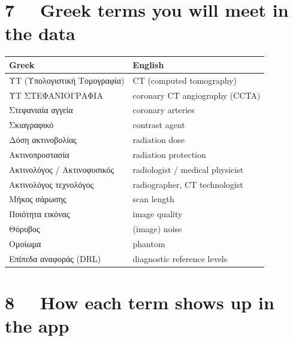 \documentclass[9pt,a4paper]{extarticle}
\newcommand{\hdr}{\rowcolor{ctsurf}}
\begin{document}
\begin{multicols}{2}
\section{7 \ \ Greek terms you will meet in the data}

\begin{tabularx}{\columnwidth}{@{}L L@{}}
\toprule
\hdr \textbf{Greek} & \textbf{English}\\
\midrule
ΥΤ (Υπολογιστική Τομογραφία) & CT (computed tomography)\\
ΥΤ ΣΤΕΦΑΝΙΟΓΡΑΦΙΑ & coronary CT angiography (CCTA)\\
Στεφανιαία αγγεία & coronary arteries\\
Σκιαγραφικό & contrast agent\\
Δόση ακτινοβολίας & radiation dose\\
Ακτινοπροστασία & radiation protection\\
Ακτινολόγος / Ακτινοφυσικός & radiologist / medical physicist\\
Ακτινολόγος τεχνολόγος & radiographer, CT technologist\\
Μήκος σάρωσης & scan length\\
Ποιότητα εικόνας & image quality\\
Θόρυβος & (image) noise\\
Ομοίωμα & phantom\\
Επίπεδα αναφοράς (DRL) & diagnostic reference levels\\
\bottomrule
\end{tabularx}

\section{8 \ \ How each term shows up in the app}


\end{multicols}
\end{document}
